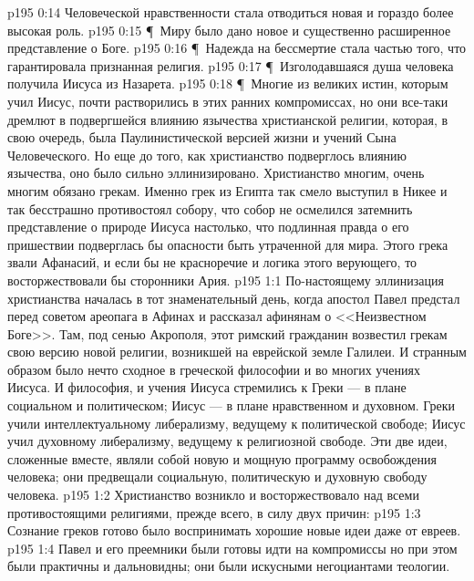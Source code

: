 \vs p195 0:14 \bibnobreakspace Человеческой нравственности стала отводиться новая и гораздо более высокая роль.
\vs p195 0:15 \P\ \bibnobreakspace Миру было дано новое и существенно расширенное представление о Боге.
\vs p195 0:16 \P\ \bibnobreakspace Надежда на бессмертие стала частью того, что гарантировала признанная религия.
\vs p195 0:17 \P\ \bibnobreakspace Изголодавшаяся душа человека получила Иисуса из Назарета.
\vs p195 0:18 \P\ Многие из великих истин, которым учил Иисус, почти растворились в этих ранних компромиссах, но они все\hyp{}таки дремлют в подвергшейся влиянию язычества христианской религии, которая, в свою очередь, была Паулинистической версией жизни и учений Сына Человеческого. Но еще до того, как христианство подверглось влиянию язычества, оно было сильно эллинизировано. Христианство многим, очень многим обязано грекам. Именно грек из Египта так смело выступил в Никее и так бесстрашно противостоял собору, что собор не осмелился затемнить представление о природе Иисуса настолько, что подлинная правда о его пришествии подверглась бы опасности быть утраченной для мира. Этого грека звали Афанасий, и если бы не красноречие и логика этого верующего, то восторжествовали бы сторонники Ария.
\vs p195 1:1 По\hyp{}настоящему эллинизация христианства началась в тот знаменательный день, когда апостол Павел предстал перед советом ареопага в Афинах и рассказал афинянам о <<Неизвестном Боге>>. Там, под сенью Акрополя, этот римский гражданин возвестил грекам свою версию новой религии, возникшей на еврейской земле Галилеи. И странным образом было нечто сходное в греческой философии и во многих учениях Иисуса. И философия, и учения Иисуса стремились к  Греки --- в плане социальном и политическом; Иисус --- в плане нравственном и духовном. Греки учили интеллектуальному либерализму, ведущему к политической свободе; Иисус учил духовному либерализму, ведущему к религиозной свободе. Эти две идеи, сложенные вместе, являли собой новую и мощную программу освобождения человека; они предвещали социальную, политическую и духовную свободу человека.
\vs p195 1:2 Христианство возникло и восторжествовало над всеми противостоящими религиями, прежде всего, в силу двух причин:
\vs p195 1:3 \bibnobreakspace Сознание греков готово было воспринимать хорошие новые идеи даже от евреев.
\vs p195 1:4 \bibnobreakspace Павел и его преемники были готовы идти на компромиссы но при этом были практичны и дальновидны; они были искусными негоциантами теологии.
